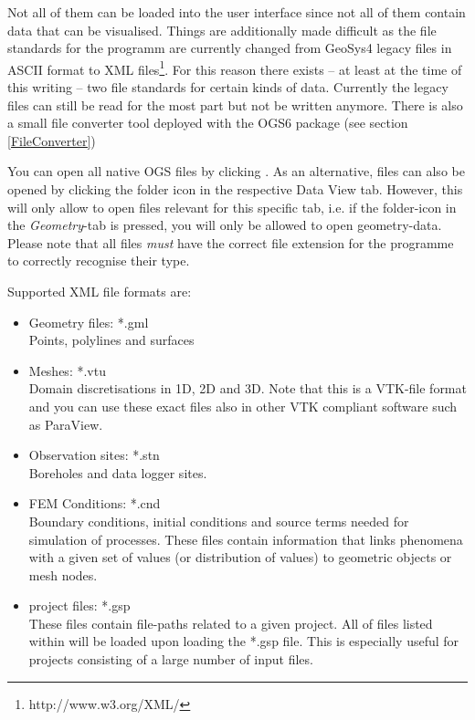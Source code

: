 Not all of them can be loaded into the user interface since not all of them contain data that can be visualised. Things are additionally made difficult as the file standards for the programm are currently changed from GeoSys4 legacy files in ASCII format to XML files\footnote{http://www.w3.org/XML/}. For this reason there exists -- at least at the time of this writing -- two file standards for certain kinds of data. Currently the legacy files can still be read for the most part but not be written anymore. There is also a small file converter tool deployed with the OGS6 package (see section \ref{FileConverter})

You can open all native OGS files by clicking . As an alternative, files can also be opened by clicking the folder icon in the respective Data View tab. However, this will only allow to open files relevant for this specific tab, i.e. if the folder-icon in the \emph{Geometry}-tab is pressed, you will only be allowed to open geometry-data. Please note that all files \emph{must} have the correct file extension for the programme to correctly recognise their type.

Supported XML file formats are:
\begin{itemize}
\item Geometry files: *.gml\\
        Points, polylines and surfaces
\item Meshes: *.vtu\\
        Domain discretisations in 1D, 2D and 3D. Note that this is a VTK-file format and you can use these exact files also in other VTK compliant software such as ParaView.
\item Observation sites: *.stn\\
        Boreholes and data logger sites.
\item FEM Conditions: *.cnd\\
        Boundary conditions, initial conditions and source terms needed for simulation of processes. These files contain information that links phenomena with a given set of values (or distribution of values) to geometric objects or mesh nodes.
\item \ogs project files: *.gsp\\
    These files contain file-paths related to a given project. All of files listed within will be loaded upon loading the *.gsp file. This is especially useful for projects consisting of a large number of input files.
\end{itemize}

